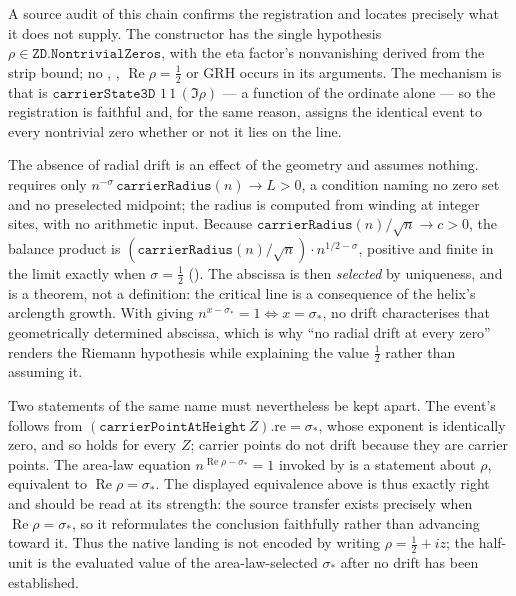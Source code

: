 \documentclass[11pt]{article}
\theoremstyle{definition}
\renewcommand{\Re}{\operatorname{Re}}
\begin{document}
A source audit of this chain confirms the registration and locates precisely
what it does not supply. The constructor
 has the single hypothesis
\(\rho\in\texttt{ZD.NontrivialZeros}\), with the eta factor's nonvanishing
derived from the strip bound; no ,
, \(\Re\rho=\tfrac12\) or GRH occurs in its arguments. The
mechanism is that  is
\(\texttt{carrierState3D }1\,1\,(\Im\rho)\) --- a function of the ordinate
alone --- so the registration is faithful and, for the same reason, assigns
the identical event to every nontrivial zero whether or not it lies on the
line.

The absence of radial drift is an effect of the geometry and assumes nothing.
 requires only
\(n^{-\sigma}\,\texttt{carrierRadius}(n)\to L>0\), a condition naming no zero
set and no preselected midpoint; the radius is computed from winding at
integer sites, with no arithmetic input. Because
\(\texttt{carrierRadius}(n)/\sqrt n\to c>0\), the balance product is
\((\texttt{carrierRadius}(n)/\sqrt n)\cdot n^{1/2-\sigma}\), positive and
finite in the limit exactly when \(\sigma=\tfrac12\)
(). The abscissa is then \emph{selected} by
uniqueness, and  is a theorem, not a definition:
the critical line is a consequence of the helix's arclength growth. With
 giving \(n^{x-\sigma_*}=1\iff
x=\sigma_*\), no drift characterises that geometrically determined abscissa,
which is why ``no radial drift at every zero'' renders the Riemann hypothesis
while explaining the value \(\tfrac12\) rather than assuming it.

Two statements of the same name must nevertheless be kept apart. The event's
 follows from
\(({\texttt{carrierPointAtHeight}}\,Z).\mathrm{re}=\sigma_*\), whose exponent
is identically zero, and so holds for every \(Z\); carrier points do not
drift because they are carrier points. The area-law equation
\(n^{\Re\rho-\sigma_*}=1\) invoked by
 is a statement
about \(\rho\), equivalent to \(\Re\rho=\sigma_*\). The displayed equivalence
above is thus exactly right and should be read at its strength: the source
transfer exists precisely when \(\Re\rho=\sigma_*\), so it reformulates the
conclusion faithfully rather than advancing toward it.
Thus the native landing is not encoded by writing
\(\rho=\tfrac12+i z\); the half-unit is the evaluated value of the
area-law-selected \(\sigma_*\) after no drift has been established.
\end{document}
